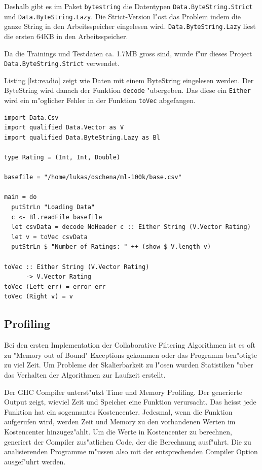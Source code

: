 \documentclass[a4paper, 12pt]{article}
\begin{document}
Deshalb gibt es im Paket \verb|bytestring| die Datentypen \verb|Data.ByteString.Strict| und \verb|Data.ByteString.Lazy|. Die Strict-Version l"ost das Problem indem die ganze String in den Arbeitsspeicher eingelesen wird. \verb|Data.ByteString.Lazy| liest die ersten 64KB in den Arbeitsspeicher.

Da die Trainings und Testdaten ca. 1.7MB gross sind, wurde f"ur dieses Project \verb|Data.ByteString.Strict| verwendet.

Listing \ref{lst:readio} zeigt wie Daten mit einem ByteString eingelesen werden. Der ByteString wird danach der Funktion \verb|decode| "ubergeben. Das diese ein \verb|Either| wird ein m"oglicher Fehler in der Funktion \verb|toVec| abgefangen.

\begin{lstlisting}[label={lst:readio},caption={Einlesen von Files mit ByteString}]
import Data.Csv
import qualified Data.Vector as V
import qualified Data.ByteString.Lazy as Bl

type Rating = (Int, Int, Double)

basefile = "/home/lukas/oschena/ml-100k/base.csv"

main = do
  putStrLn "Loading Data"
  c <- Bl.readFile basefile
  let csvData = decode NoHeader c :: Either String (V.Vector Rating)
  let v = toVec csvData
  putStrLn $ "Number of Ratings: " ++ (show $ V.length v)

toVec :: Either String (V.Vector Rating)
      -> V.Vector Rating
toVec (Left err) = error err
toVec (Right v) = v
\end{lstlisting}

\subsection{Profiling}
\label{sec:profiling}

Bei den ersten Implementation der Collaborative Filtering Algorithmen ist es oft zu "Memory out of Bound" Exceptions gekommen oder das Programm ben"otigte zu viel Zeit. Um Probleme der Skalierbarkeit zu l"osen wurden Statistiken "uber das Verhalten der Algorithmen zur Laufzeit erstellt.

Der GHC Compiler unterst"utzt Time und Memory Profiling. Der generierte Output zeigt, wieviel Zeit und Speicher eine Funktion verursacht. Das heisst jede Funktion hat ein sogennantes Kostencenter. Jedesmal, wenn die Funktion aufgerufen wird, werden Zeit und Memory zu den vorhandenen Werten im Kostencenter hinzugez"ahlt. Um die Werte in Kostencenter zu berechnen, generiert der Compiler zus"atlichen Code, der die Berechnung ausf"uhrt. Die zu analisierenden Programme m"ussen also mit der entsprechenden Compiler Option ausgef"uhrt werden.
\end{document}
